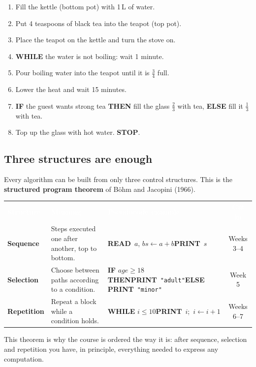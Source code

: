 \documentclass[11pt,a4paper]{article}
\newcommand{\READ}{\textbf{READ}\ }
\newcommand{\PRINT}{\textbf{PRINT}\ }
\newcommand{\str}[1]{\texttt{"#1"}}
\newcommand{\term}[1]{\textbf{\color{ink}#1}}
\newcommand{\hdr}[1]{\textcolor{white}{\sffamily\bfseries #1}}
\newcommand{\hrow}{\rowcolor{ink}}
\begin{document}
\begin{pseudobox}
\begin{enumerate}[leftmargin=*,itemsep=0pt]
  \item Fill the kettle (bottom pot) with 1\,L of water.
  \item Put 4 teaspoons of black tea into the teapot (top pot).
  \item Place the teapot on the kettle and turn the stove on.
  \item \textcolor{repc}{\textbf{WHILE} the water is not boiling: wait 1 minute.}
  \item Pour boiling water into the teapot until it is $\tfrac34$ full.
  \item Lower the heat and wait 15 minutes.
  \item \textcolor{selc}{\textbf{IF} the guest wants strong tea \textbf{THEN} fill the glass $\tfrac23$ with tea, \textbf{ELSE} fill it $\tfrac13$ with tea.}
  \item Top up the glass with hot water. \textbf{STOP}.
\end{enumerate}
\end{pseudobox}

\subsection{Three structures are enough}
Every algorithm can be built from only three control structures. This is the \term{structured program theorem} of B\"ohm and Jacopini (1966).

\begin{center}\small
\begin{tabularx}{\linewidth}{>{\bfseries}p{24mm}L>{\raggedright\arraybackslash}p{44mm}c}
\hrow \hdr{Structure} & \hdr{Meaning} & \hdr{Pseudocode example} & \hdr{C\# in}\\
\textcolor{seqc}{Sequence} & Steps executed one after another, top to bottom. & \READ $a$, $b$\newline $s\gets a+b$\newline \PRINT $s$ & Weeks 3--4\\
\textcolor{selc}{Selection} & Choose between paths according to a condition. & \textbf{IF} $age\ge 18$ \textbf{THEN}\newline\hspace*{3mm}\PRINT\str{adult}\newline\textbf{ELSE} \PRINT\str{minor} & Week 5\\
\textcolor{repc}{Repetition} & Repeat a block while a condition holds. & \textbf{WHILE} $i\le 10$\newline\hspace*{3mm}\PRINT $i$;\ $i\gets i+1$ & Weeks 6--7\\
\end{tabularx}
\end{center}
This theorem is why the course is ordered the way it is: after sequence, selection and repetition you have, in principle, everything needed to express any computation.
\end{document}

